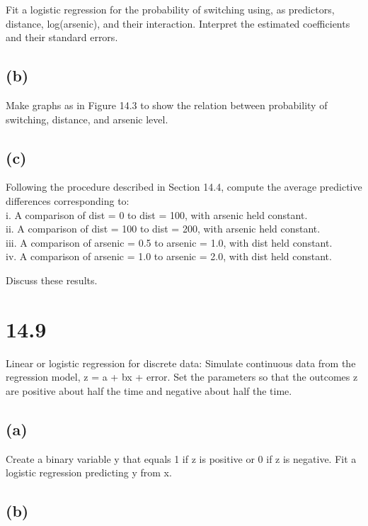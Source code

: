 \documentclass[
]{article}
\begin{document}
Fit a logistic regression for the probability of switching using, as
predictors, distance, log(arsenic), and their interaction. Interpret the
estimated coefficients and their standard errors.

\hypertarget{b-6}{%
\subsection{(b)}\label{b-6}}

Make graphs as in Figure 14.3 to show the relation between probability
of switching, distance, and arsenic level.

\hypertarget{c-2}{%
\subsection{(c)}\label{c-2}}

Following the procedure described in Section 14.4, compute the average
predictive differences corresponding to:\\
i. A comparison of dist = 0 to dist = 100, with arsenic held constant.\\
ii. A comparison of dist = 100 to dist = 200, with arsenic held
constant.\\
iii. A comparison of arsenic = 0.5 to arsenic = 1.0, with dist held
constant.\\
iv. A comparison of arsenic = 1.0 to arsenic = 2.0, with dist held
constant.

Discuss these results.

\hypertarget{section-6}{%
\section{14.9}\label{section-6}}

Linear or logistic regression for discrete data: Simulate continuous
data from the regression model, z = a + bx + error. Set the parameters
so that the outcomes z are positive about half the time and negative
about half the time.

\hypertarget{a-7}{%
\subsection{(a)}\label{a-7}}

Create a binary variable y that equals 1 if z is positive or 0 if z is
negative. Fit a logistic regression predicting y from x.

\hypertarget{b-7}{%
\subsection{(b)}\label{b-7}}
\end{document}
